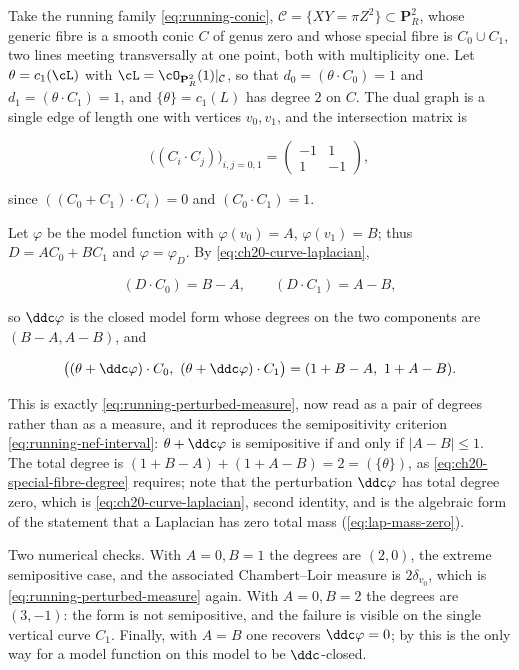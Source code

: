 \begin{example}
\label{ex:ch20-conic-ddc}
Take the running family \eqref{eq:running-conic},
$\mathcal C=\{XY=\pi Z^2\}\subset\mathbf P^2_R$, whose generic fibre is a
smooth conic $C$ of genus zero and whose special fibre is
$C_0\cup C_1$, two lines meeting transversally at one point, both with
multiplicity one.  Let
$\theta=c_1(\cL)$ with $\cL=\cO_{\mathbf P^2_R}(1)|_{\mathcal C}$, so
that $d_0=(\theta\cdot C_0)=1$ and $d_1=(\theta\cdot C_1)=1$, and
$\{\theta\}=c_1(L)$ has degree $2$ on $C$.  The dual graph is a single
edge of length one with vertices $v_0,v_1$, and the intersection matrix is

\begin{equation}
\label{eq:ch20-conic-matrix}
 \bigl((C_i\cdot C_j)\bigr)_{i,j=0,1}
 =\begin{pmatrix}-1&1\\1&-1\end{pmatrix},
\end{equation}

since $((C_0+C_1)\cdot C_i)=0$ and $(C_0\cdot C_1)=1$.

Let $\varphi$ be the model function with $\varphi(v_0)=A$,
$\varphi(v_1)=B$; thus $D=AC_0+BC_1$ and $\varphi=\varphi_D$.  By
\eqref{eq:ch20-curve-laplacian},

\[
 (D\cdot C_0)=B-A,
 \qquad
 (D\cdot C_1)=A-B,
\]

so $\ddc\varphi$ is the closed model form whose degrees on the two
components are $(B-A,A-B)$, and

\begin{equation}
\label{eq:ch20-conic-perturbed-degrees}
 \bigl((\theta+\ddc\varphi)\cdot C_0,\ (\theta+\ddc\varphi)\cdot C_1\bigr)
 =(1+B-A,\ 1+A-B).
\end{equation}

This is exactly \eqref{eq:running-perturbed-measure}, now read as a pair of
degrees rather than as a measure, and it reproduces the semipositivity
criterion \eqref{eq:running-nef-interval}: $\theta+\ddc\varphi$ is
semipositive if and only if $|A-B|\leq1$.  The total degree is
$(1+B-A)+(1+A-B)=2=(\{\theta\})$, as
\eqref{eq:ch20-special-fibre-degree} requires; note that the perturbation
$\ddc\varphi$ has total degree zero, which is
\eqref{eq:ch20-curve-laplacian}, second identity, and is the algebraic form
of the statement that a Laplacian has zero total mass
(\eqref{eq:lap-mass-zero}).

Two numerical checks.  With $A=0,B=1$ the degrees are $(2,0)$, the
extreme semipositive case, and the associated Chambert--Loir measure is
$2\delta_{v_0}$, which is \eqref{eq:running-perturbed-measure} again.
With $A=0,B=2$ the degrees are $(3,-1)$: the form is not semipositive,
and the failure is visible on the single vertical curve $C_1$.  Finally,
with $A=B$ one recovers $\ddc\varphi=0$; by
 this is the only way for a model function on this
model to be $\ddc$-closed.
\end{example}

